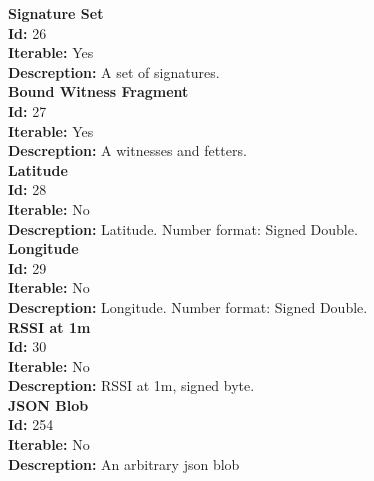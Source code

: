 \documentclass[11pt]{article}
\begin{document}
\noindent
\textbf{Signature Set} \\
\indent \textbf{Id:} 26 \\
\indent \textbf{Iterable:} Yes \\
\indent \textbf{Descreption:} A set of signatures. \\

\noindent
\textbf{Bound Witness Fragment} \\
\indent \textbf{Id:} 27 \\
\indent \textbf{Iterable:} Yes \\
\indent \textbf{Descreption:} A witnesses and fetters. \\

\noindent
\textbf{Latitude} \\
\indent \textbf{Id:} 28 \\
\indent \textbf{Iterable:} No \\
\indent \textbf{Descreption:} Latitude. Number format: Signed Double.\\

\noindent
\textbf{Longitude} \\
\indent \textbf{Id:} 29 \\
\indent \textbf{Iterable:} No \\
\indent \textbf{Descreption:} Longitude. Number format: Signed Double. \\

\noindent
\textbf{RSSI at 1m} \\
\indent \textbf{Id:} 30 \\
\indent \textbf{Iterable:} No \\
\indent \textbf{Descreption:} RSSI at 1m, signed byte.  \\

\noindent
\textbf{JSON Blob} \\
\indent \textbf{Id:} 254 \\
\indent \textbf{Iterable:} No \\
\indent \textbf{Descreption:} An arbitrary json blob \\
\end{document}
